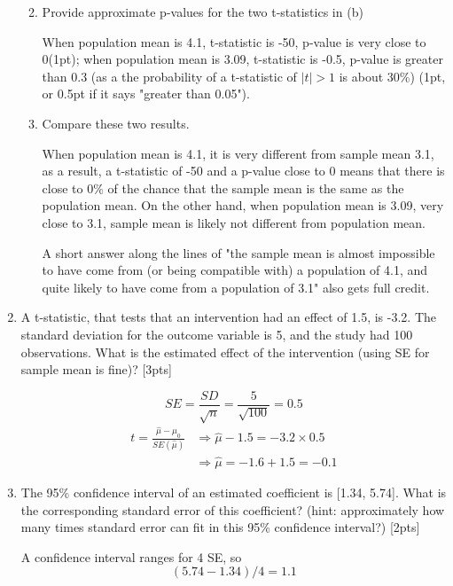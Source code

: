 \documentclass[answers]{exam}
\begin{document}
\begin{enumerate}
\begin{enumerate}[label=\alph*)]
\begin{solution}
\end{solution}

    \item Provide approximate p-values for the two t-statistics in (b)
 \begin{solution}
 When population mean is 4.1, t-statistic is -50, p-value is very close to 0(1pt); when population mean is 3.09, t-statistic is -0.5, p-value is greater than 0.3 (as a the probability of a t-statistic of $|t|>1$ is about 30\%) (1pt, or 0.5pt if it says "greater than 0.05"). 
 \end{solution} 
 
    \item Compare these two results.
    \begin{solution}
    When population mean is 4.1, it is very different from sample mean 3.1, as a result, a t-statistic of -50 and a p-value close to 0 means that there is close to 0\% of the chance that the sample mean is the same as the population mean. On the other hand, when population mean is 3.09, very close to 3.1, sample mean is likely not different from population mean.
    
    A short answer along the lines of "the sample mean is almost impossible to have come from (or being compatible with) a population of 4.1, and quite likely to have come from a population of 3.1" also gets full credit. 
    \end{solution}
\end{enumerate}


\item A t-statistic, that tests that an intervention had an effect of 1.5, is -3.2. The standard deviation for the outcome variable is 5, and the study had 100 observations. What is the estimated effect of the intervention (using SE for sample mean is fine)? [3pts]
\begin{solution}
    $$
    SE = \frac{SD}{\sqrt{n}}=\frac{5}{\sqrt{100}}=0.5
    $$
$$\begin{aligned}
t=\frac{\hat{\mu}-\mu_{0}}{S E(\hat{\mu})} & \Rightarrow \hat{\mu}-1.5=-3.2 \times 0.5 \\
& \Rightarrow \hat{\mu}=-1.6+1.5 = -0.1
\end{aligned}$$
    \end{solution}

\item The 95\% confidence interval of an estimated coefficient is [1.34, 5.74]. What is the corresponding standard error of this coefficient? (hint: approximately how many times standard error can fit in this 95\% confidence interval?) [2pts]
\begin{solution}
A confidence interval ranges for 4 SE, so 
$$(5.74-1.34)/4 = 1.1$$
\end{solution}


\end{enumerate}
\end{document}
